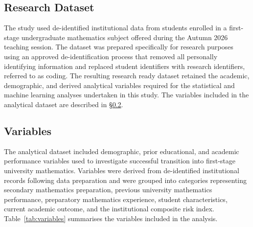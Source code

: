 


%
%
%
%
\subsection{Research Dataset} 
\label{sec:dataset}

The study used de-identified institutional data from students enrolled in a first-stage undergraduate mathematics subject offered during the Autumn 2026 teaching session. 
The dataset was prepared specifically for research purposes using an approved de-identification process that removed all personally identifying information and replaced 
student identifiers with research identifiers, referred to as coding. The resulting research ready dataset retained the academic, demographic, and derived analytical variables required 
for the statistical and machine learning analyses undertaken in this study. The variables included in the analytical dataset are described in \S\ref{sec:variables}.




\subsection{Variables} 
\label{sec:variables}

The analytical dataset included demographic, prior educational, and academic performance variables used to investigate successful transition into first-stage university 
mathematics. Variables were derived from de-identified institutional records following data preparation and were grouped into categories representing secondary mathematics 
preparation, previous university mathematics performance, preparatory mathematics experience, student characteristics, current academic outcome, and the institutional 
composite risk index. Table~\ref{tab:variables} summarises the variables included in the analysis.

